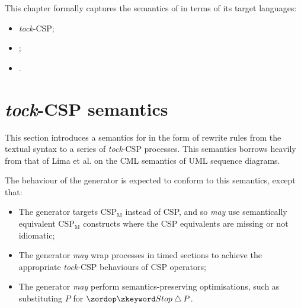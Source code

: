 
\newcommand{\tockcsp}{\emph{tock}-CSP}
\newcommand{\cspm}{CSP\(_\text{M}\)}

\newcommand{\interrupt}{\mathbin{\triangle}}
\newcommand{\defeq}{\mathbin{\overset{\text{def}}=}}
\newcommand{\events}{\mathsf{Events}}
\newcommand{\anarrow}{a}
\newcommand{\anevent}{e}
\newcommand{\agap}{g}
\newcommand{\amsgset}{M}
\newcommand{\aname}{n}
\newcommand{\anop}{o}
\newcommand{\asseq}{q}
\newcommand{\astep}{s}
\newcommand{\atarget}{t}
\newcommand{\aworld}{w}
\newcommand{\anaction}{x}
\newcommand{\refto}[1]{#1_r}

\newcommand{\sema}[1]{\llbracket #1 \rrbracket}
\newcommand{\stepsema}[1]{\sema{#1}^{\text{step}}}
\newcommand{\gapsema}[2]{\sema{#1}^{\text{gap}}_{(#2)}}
\newcommand{\actsema}[1]{\sema{#1}^{\text{act}}}
\newcommand{\arrsema}[1]{\sema{#1}^{\text{arr}}}
\newcommand{\loopsema}[2]{\sema{#1}^{\text{loop}}_{(#2)}}
\newcommand{\msgsetsema}[1]{\sema{#1}^{\text{mset}}}
\newcommand{\seqsema}[1]{\sema{#1}^{\text{seq}}}
\newcommand{\sseqsema}[1]{\sema{#1}^{\text{sseq}}}

\newcommand{\eventsof}[1]{\mathsf{eventsOf}(#1)}

This chapter formally captures the semantics of \langname{} in terms of its
target languages:

\begin{itemize}
\item
	\tockcsp;
\item
	;
\item
	.
\end{itemize}

\section{\tockcsp{} semantics}

This section introduces a semantics for \langname{} in the form of
rewrite rules from  the \langname{} textual
syntax to a series of \emph{tock}-CSP processes.
This semantics borrows heavily from that of Lima et al. on the CML semantics of
UML sequence diagrams.

The behaviour of the \langname{} generator is expected to conform to
this semantics, except that:

\begin{itemize}
\item
	The generator targets \cspm{} instead of CSP, and so \emph{may}
	use semantically equivalent \cspm{} constructs where the CSP equivalents
	are missing or not idiomatic;
\item
	The generator \emph{may}  wrap processes in
	timed sections to achieve the appropriate \tockcsp{} behaviours of
	CSP operators;
\item
	The generator \emph{may} perform semantics-preserving optimisations,
	such as substituting \(P\) for \(\Stop \interrupt P\).
\end{itemize}

